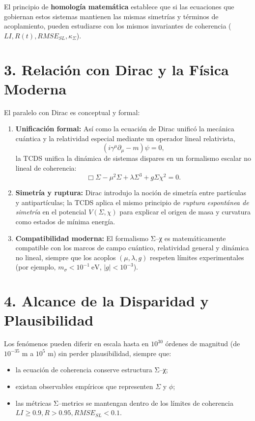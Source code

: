 \documentclass[12pt,a4paper]{article}
\begin{document}
El principio de \textbf{homología matemática} establece que si las ecuaciones que gobiernan estos sistemas mantienen las mismas simetrías y términos de acoplamiento, pueden estudiarse con los mismos invariantes de coherencia (\(LI, R(t), RMSE_{SL}, \kappa_\Sigma\)).

\section{3. Relación con Dirac y la Física Moderna}
El paralelo con Dirac es conceptual y formal:

\begin{enumerate}
\item \textbf{Unificación formal:}  
Así como la ecuación de Dirac unificó la mecánica cuántica y la relatividad especial mediante un operador lineal relativista,
\[
(i\gamma^\mu \partial_\mu - m)\psi = 0,
\]
la TCDS unifica la dinámica de sistemas dispares en un formalismo escalar no lineal de coherencia:
\[
\Box \Sigma - \mu^2 \Sigma + \lambda \Sigma^3 + g\Sigma\chi^2 = 0.
\]

\item \textbf{Simetría y ruptura:}  
Dirac introdujo la noción de simetría entre partículas y antipartículas; la TCDS aplica el mismo principio de \textit{ruptura espontánea de simetría} en el potencial \(V(\Sigma,\chi)\) para explicar el origen de masa y curvatura como estados de mínima energía.

\item \textbf{Compatibilidad moderna:}  
El formalismo Σ–χ es matemáticamente compatible con los marcos de campo cuántico, relatividad general y dinámica no lineal, siempre que los acoplos \((\mu,\lambda,g)\) respeten límites experimentales (por ejemplo, \(m_\sigma < 10^{-1}\ \text{eV}\), \(|g|<10^{-3}\)).
\end{enumerate}

\section{4. Alcance de la Disparidad y Plausibilidad}
Los fenómenos pueden diferir en escala hasta en \(10^{30}\) órdenes de magnitud (de \(10^{-35}\) m a \(10^{5}\) m) sin perder plausibilidad, siempre que:
\begin{itemize}
    \item la ecuación de coherencia conserve estructura Σ–χ;
    \item existan observables empíricos que representen \(\Sigma\) y \(\phi\);
    \item las métricas Σ–metrics se mantengan dentro de los límites de coherencia \(LI \ge 0.9, R > 0.95, RMSE_{SL} < 0.1\).
\end{itemize}
\end{document}
